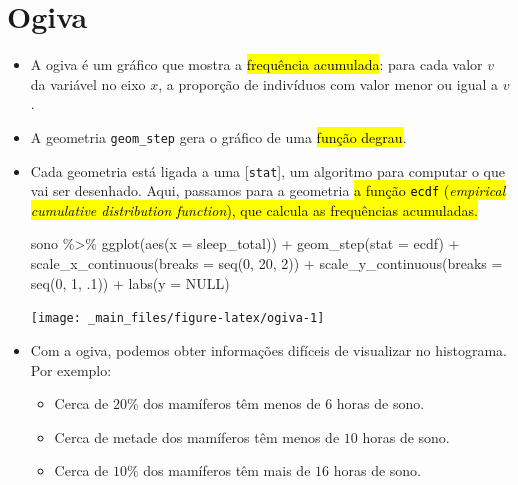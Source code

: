 \documentclass[
  11pt]{report}
\newenvironment{Shaded}{\begin{snugshade}}{\end{snugshade}}
\newcommand{\AttributeTok}[1]{\textcolor[rgb]{0.77,0.63,0.00}{#1}}
\newcommand{\ConstantTok}[1]{\textcolor[rgb]{0.00,0.00,0.00}{#1}}
\newcommand{\DecValTok}[1]{\textcolor[rgb]{0.00,0.00,0.81}{#1}}
\newcommand{\FunctionTok}[1]{\textcolor[rgb]{0.00,0.00,0.00}{#1}}
\newcommand{\NormalTok}[1]{#1}
\newcommand{\SpecialCharTok}[1]{\textcolor[rgb]{0.00,0.00,0.00}{#1}}
\newcommand{\StringTok}[1]{\textcolor[rgb]{0.31,0.60,0.02}{#1}}
\begin{document}
\hypertarget{ogiva}{%
\section{Ogiva}\label{ogiva}}

\begin{itemize}
\item
  A ogiva é um gráfico que mostra a {\hl{frequência acumulada}}: para cada valor \(v\) da variável no eixo \(x\), a proporção de indivíduos com valor menor ou igual a \(v\).
\item
  A geometria \texttt{geom\_step} gera o gráfico de uma {\hl{função degrau}}.
\item
  Cada geometria está ligada a uma {[}\texttt{stat}{]}, um algoritmo para computar o que vai ser desenhado. Aqui, passamos para a geometria {\hl{a função \texttt{ecdf} (\emph{empirical cumulative distribution function}), que calcula as frequências acumuladas.}}

\begin{Shaded}
\begin{Highlighting}[]
\NormalTok{sono }\SpecialCharTok{\%\textgreater{}\%} 
  \FunctionTok{ggplot}\NormalTok{(}\FunctionTok{aes}\NormalTok{(}\AttributeTok{x =}\NormalTok{ sleep\_total)) }\SpecialCharTok{+}
    \FunctionTok{geom\_step}\NormalTok{(}\AttributeTok{stat =} \StringTok{\textquotesingle{}ecdf\textquotesingle{}}\NormalTok{) }\SpecialCharTok{+}
    \FunctionTok{scale\_x\_continuous}\NormalTok{(}\AttributeTok{breaks =} \FunctionTok{seq}\NormalTok{(}\DecValTok{0}\NormalTok{, }\DecValTok{20}\NormalTok{, }\DecValTok{2}\NormalTok{)) }\SpecialCharTok{+}
    \FunctionTok{scale\_y\_continuous}\NormalTok{(}\AttributeTok{breaks =} \FunctionTok{seq}\NormalTok{(}\DecValTok{0}\NormalTok{, }\DecValTok{1}\NormalTok{, .}\DecValTok{1}\NormalTok{)) }\SpecialCharTok{+}
    \FunctionTok{labs}\NormalTok{(}\AttributeTok{y =} \ConstantTok{NULL}\NormalTok{)}
\end{Highlighting}
\end{Shaded}

  \begin{center}\texttt{[image: \_main\_files/figure-latex/ogiva-1]} \end{center}
\item
  Com a ogiva, podemos obter informações difíceis de visualizar no histograma. Por exemplo:

  \begin{itemize}
  \item
    Cerca de \(20\%\) dos mamíferos têm menos de \(6\) horas de sono.
  \item
    Cerca de metade dos mamíferos têm menos de \(10\) horas de sono.
  \item
    Cerca de \(10\%\) dos mamíferos têm mais de \(16\) horas de sono.
  \end{itemize}
\end{itemize}
\end{document}
